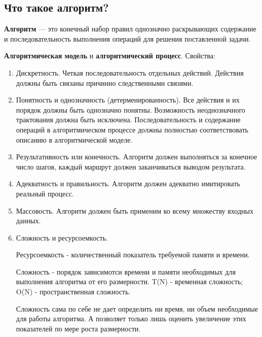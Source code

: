\subsection{Что такое алгоритм?}
\textbf{Алгоритм} --- это конечный набор правил однозначно раскрывающих
содержание и последовательность выполнения операций для решения поставленной
задачи.\par
\textbf{Алгоритмическая модель} и \textbf{алгоритмический процесс}. Свойства:
\begin{enumerate}
  \item Дискретность. Четкая последовательность отдельных действий. Действия
    должны быть связаны причинно следственными связями.
  \item Понятность и однозначность (детерменированность). Все действия и их
    порядок должны быть однозначно понятны. Возможность неоднозначного трактования должна быть исключена. Последовательность и содержание операций в алгоритмическом процессе
    должны полностью соответствовать описанию в алгоритмической моделе.
  \item Результативность или конечность. Алгоритм должен выполняться за конечное
    число шагов, каждый маршрут должен заканчиваться выводом результата.
  \item Адекватность и правильность. Алгоритм должен адекватно имитировать
    реальный процесс.
  \item Массовость. Алгоритм должен быть применим ко всему множеству входных
    данных.
  \item Сложность и ресурсоемкость.\\
    {\ttfamily Ресурсоемкость - количественный показатель требуемой памяти и
    времени. 
    
    Сложность - порядок зависимотси времени и памяти необходимых для
    выполнения алгоритма от его размерности. T(N) - временная сложность; O(N) -
    пространственная сложность. 
    
    Сложность сама по себе не дает определить ни
    время, ни объем необходимые для работы алгоритма. А позволяет только лишь
    оценить увеличение этих показателей по мере роста размерности.}
\end{enumerate}


